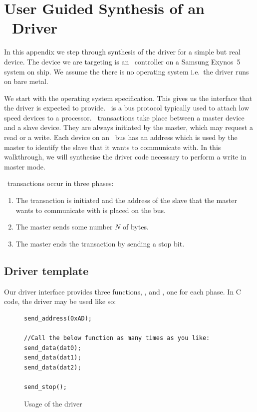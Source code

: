 \chapter{User Guided Synthesis of an \iic\ Driver}
\label{ch:worked_example}

In this appendix we step through synthesis of the driver for a simple but real device. The device we are targeting is an \iic\ controller on a Samsung Exynos~5 system on ship. We assume the there is no operating system i.e.\ the driver runs on bare metal.

We start with the operating system specification. This gives us the interface that the driver is expected to provide. \iic\ is a bus protocol typically used to attach low speed devices to a processor. \iic\ transactions take place between a master device and a slave device. They are always initiated by the master, which may request a read or a write. Each device on an \iic\ bus has an address which is used by the master to identify the slave that it wants to communicate with. In this walkthrough, we will synthesise the driver code necessary to perform a write in master mode. 

\iic\ transactions occur in three phases:
\begin{enumerate}
    \item The transaction is initiated and the address of the slave that the master wants to communicate with is placed on the bus.
    \item The master sends some number $N$ of bytes.
    \item The master ends the transaction by sending a stop bit.
\end{enumerate}

\section{Driver template}

Our driver interface provides three functions, ,  and , one for each phase. In C code, the driver may be used like so:
\begin{figure}
\caption{Usage of the \iic driver}
\label{fig:iic_usage}
\begin{lstlisting}[frame=single]
send_address(0xAD);

//Call the below function as many times as you like:
send_data(dat0);
send_data(dat1);
send_data(dat2);

send_stop();
\end{lstlisting}
\end{figure}

